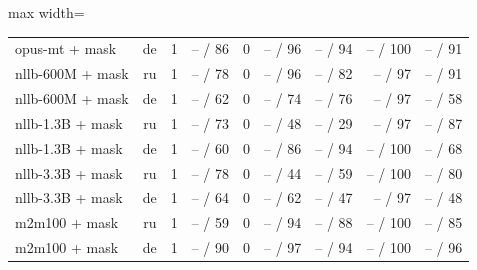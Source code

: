 \begin{table}[t]
\begin{adjustbox}{max width=\textwidth}
\begin{tabular}{lrrrrrrrr}
opus-mt + mask & de & 1 & -- / 86 & 0 & -- / 96 & -- / 94 & -- / 100 & -- / 91 \\
nllb-600M + mask & ru & 1 & -- / 78 & 0 & -- / 96 & -- / 82 & -- / 97 & -- / 91 \\
nllb-600M + mask & de & 1 & -- / 62 & 0 & -- / 74 & -- / 76 & -- / 97 & -- / 58 \\
nllb-1.3B + mask & ru & 1 & -- / 73 & 0 & -- / 48 & -- / 29 & -- / 97 & -- / 87 \\
nllb-1.3B + mask & de & 1 & -- / 60 & 0 & -- / 86 & -- / 94 & -- / 100 & -- / 68 \\
nllb-3.3B + mask & ru & 1 & -- / 78 & 0 & -- / 44 & -- / 59 & -- / 100 & -- / 80 \\
nllb-3.3B + mask & de & 1 & -- / 64 & 0 & -- / 62 & -- / 47 & -- / 97 & -- / 48 \\
m2m100 + mask & ru & 1 & -- / 59 & 0 & -- / 94 & -- / 88 & -- / 100 & -- / 85 \\
m2m100 + mask & de & 1 & -- / 90 & 0 & -- / 97 & -- / 94 & -- / 100 & -- / 96 \\
\bottomrule
\end{tabular}
\end{adjustbox}
\end{table}